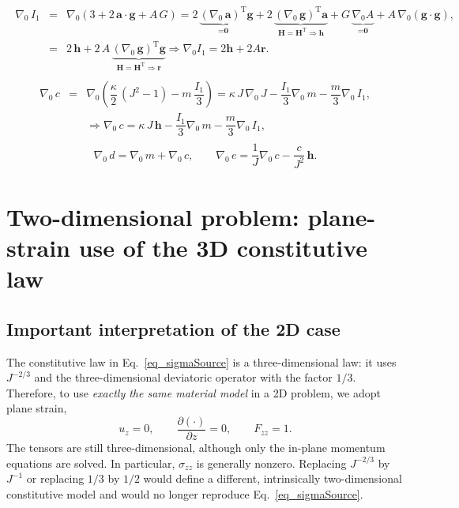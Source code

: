 \documentclass[11pt,a4paper]{article}
\newcommand{\Grad}{\nabla}
\begin{document}
\begin{eqnarray}\label{eq_gradI1}
\begin{array}{rcl}
\Grad_0\, I_1&=&\Grad_0\left(3+2\,\textbf{a}\cdot\textbf{g}+A\,G\right)=2\,\underbrace{\left( \Grad_0\, \textbf{a}\right)^\text{T}}_{=\textbf{0}}\textbf{g}+2\,\underbrace{\left( \Grad_0\, \textbf{g}\right)^\text{T}\textbf{a}}_{\textbf{H}=\textbf{H}^\text{T}\Rightarrow\textbf{h}} +G\,\underbrace{\Grad_0 A}_{=\textbf{0}} + A\,\Grad_0 \left( \textbf{g}\cdot \textbf{g}\right),\\[1ex]
&=&2\,\textbf{h} + 2\,A\,\underbrace{\left( \Grad_0\, \textbf{g}\right)^\text{T}\textbf{g}}_{\textbf{H}=\textbf{H}^\text{T}\Rightarrow\textbf{r}}\Rightarrow \boxed{\Grad_0 I_1=2\textbf{h}+2A\textbf{r}}.
\end{array}
\end{eqnarray}
%
\begin{eqnarray}\label{eq_gradc}
\begin{array}{rcl}
\Grad_0\, c&=&\Grad_0\left(\dfrac{\kappa}{2}\,(J^2-1)-m\,\dfrac{I_1}{3}\right)=\kappa\,J\,\Grad_0\, J-\dfrac{I_1}{3}\Grad_0\, m - \dfrac{m}{3}\Grad_0\, I_1,\\[1ex] 
&&\Rightarrow\boxed{\Grad_0\, c=\kappa\,J\,\textbf{h}-\dfrac{I_1}{3}\Grad_0\, m - \dfrac{m}{3}\Grad_0\, I_1},
\end{array}
\end{eqnarray}
%
\begin{eqnarray}
\boxed{
\Grad_0\, d=\Grad_0\, m+\Grad_0\, c,
\qquad
\Grad_0\, e=\dfrac1J\Grad_0\, c-\dfrac{c}{J^2}\,\textbf{h}
}.
\label{eq_gradde}
\end{eqnarray}



\section{Two-dimensional problem: plane-strain use of the 3D constitutive law}

\subsection{Important interpretation of the 2D case}

The constitutive law in Eq.~\eqref{eq_sigmaSource} is a three-dimensional law:
it uses $J^{-2/3}$ and the three-dimensional deviatoric operator with the factor
$1/3$. Therefore, to use \emph{exactly the same material model} in a 2D problem,
we adopt plane strain,
%
\begin{equation}
\boxed{
u_z=0,
\qquad
\dfrac{\partial(\cdot)}{\partial z}=0,
\qquad
F_{zz}=1
}.
\end{equation}
%
The tensors are still three-dimensional, although only the in-plane momentum
equations are solved. In particular, $\sigma_{zz}$ is generally nonzero. Replacing
$J^{-2/3}$ by $J^{-1}$ or replacing $1/3$ by $1/2$ would define a different,
intrinsically two-dimensional constitutive model and would no longer reproduce
Eq.~\eqref{eq_sigmaSource}.
\end{document}
